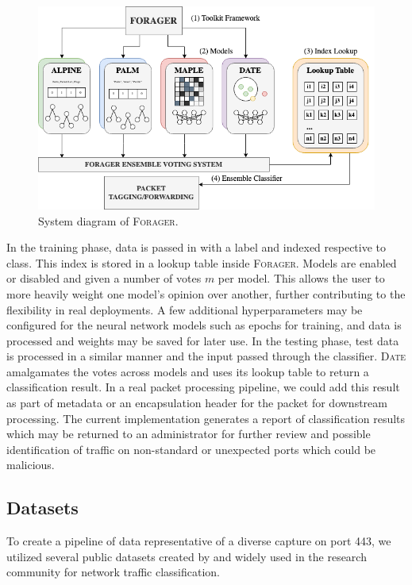 \begin{figure} [ht!]
\centering
\includegraphics[scale=0.5]{chapters/7/img/forager.png}
\caption{System diagram of \textsc{Forager}.}
\label{fig:forager}
\end{figure}

In the training phase, data is passed in with a label and indexed respective to class. This index is stored in a lookup table inside \textsc{Forager}. Models are enabled or disabled and given a number of votes $m$ per model. This allows the user to more heavily weight one model's opinion over another, further contributing to the flexibility in real deployments. A few additional hyperparameters may be configured for the neural network models such as epochs for training, and data is processed and weights may be saved for later use. In the testing phase, test data is processed in a similar manner and the input passed through the classifier. \textsc{Date} amalgamates the votes across models and uses its lookup table to return a classification result. In a real packet processing pipeline, we could add this result as part of metadata or an encapsulation header for the packet for downstream processing. The current implementation generates a report of classification results which may be returned to an administrator for further review and possible identification of traffic on non-standard or unexpected ports which could be malicious.

\subsection{Datasets}
To create a pipeline of data representative of a diverse capture on port 443, we utilized several public datasets created by and widely used in the research community for network traffic classification.

